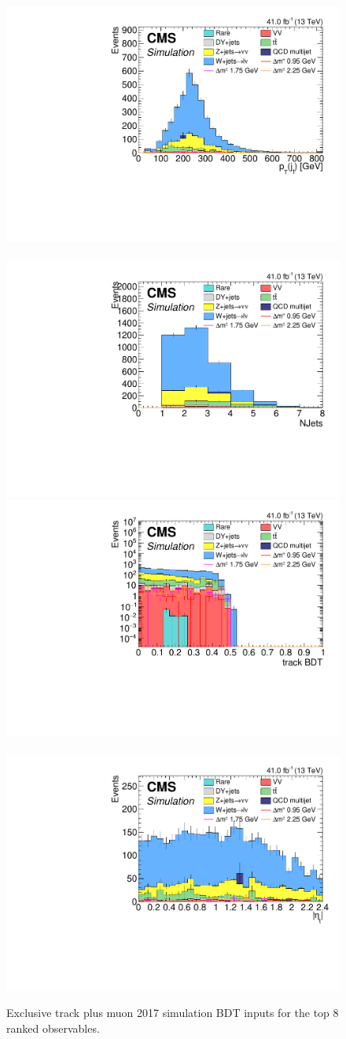 \begin{figure}[!htb]
\includegraphics[width=0.48\linewidth]{plots/track_muon_bg_signal/none_LeadingJetPt.pdf} \,
\includegraphics[width=0.48\linewidth]{plots/track_muon_bg_signal/none_NJets.pdf} \\
\includegraphics[width=0.48\linewidth]{plots/track_muon_bg_signal/none_trackBDTCorrJetNoMultIso10Dr0.6_log.pdf} \,
\includegraphics[width=0.48\linewidth]{plots/track_muon_bg_signal/none_abs(trackCorrJetNoMultIso10Dr0.6.Eta()).pdf} \\



\caption[Exclusive track plus muon simulation BDT inputs]{Exclusive track plus muon 2017 simulation BDT inputs for the top 8 ranked observables.}
\label{fig:exclusive-track-muon-bdt-sim-inputs}
\end{figure}


